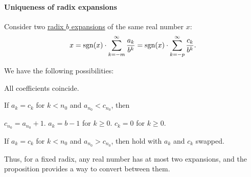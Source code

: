 \paragraph{Uniqueness of radix expansions}

\begin{lemma}\label{thm:radix_expansion_conversion_lemma}
  Consider two \hyperref[def:real_number_radix_expansion]{radix \( b \) expansions} of the same real number \( x \):
  \begin{equation*}
    x = \operatorname{sgn}(x) \cdot \sum_{k=-m}^\infty \frac {a_k} {b^k} = \operatorname{sgn}(x) \cdot \sum_{k=-p}^\infty \frac {c_k} {b^k}.
  \end{equation*}

  We have the following possibilities:
  \begin{thmenum}
     All coefficients coincide.

     If \( a_k = c_k \) for \( k < n_0 \) and \( a_{n_0} < c_{n_0} \), then
    \begin{thmenum}
       \( c_{n_0} = a_{n_0} + 1 \).
       \( a_k = b - 1 \) for \( k \geq 0 \).
       \( c_k = 0 \) for \( k \geq 0 \).
    \end{thmenum}

     If \( a_k = c_k \) for \( k < n_0 \) and \( a_{n_0} > c_{n_0} \), then  hold with \( a_k \) and \( c_k \) swapped.
  \end{thmenum}
\end{lemma}
\begin{comments}
  \item Thus, for a fixed radix, any real number has at most two expansions, and the proposition provides a way to convert between them.
\end{comments}

